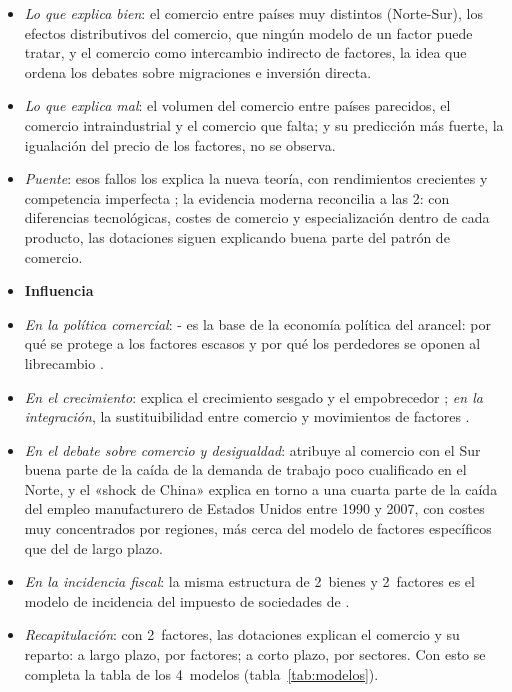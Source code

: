 \documentclass[11pt]{article}
\begin{document}
\begin{itemize}

\item \emph{Lo que explica bien}: el comercio entre países muy distintos (Norte-Sur), los efectos distributivos del comercio, que ningún modelo de un factor puede tratar, y el comercio como intercambio indirecto de factores, la idea que ordena los debates sobre migraciones e inversión directa.
\item \emph{Lo que explica mal}: el volumen del comercio entre países parecidos, el comercio intraindustrial y el comercio que falta\nocite{Trefler1995Case}; y su predicción más fuerte, la igualación del precio de los factores, no se observa.
\item \emph{Puente}: esos fallos los explica la nueva teoría, con rendimientos crecientes y competencia imperfecta ; la evidencia moderna reconcilia a las 2: con diferencias tecnológicas, costes de comercio y especialización dentro de cada producto, las dotaciones siguen explicando buena parte del patrón de comercio\nocite{Leamer1995Heckscher}.
\item[] \textbf{Influencia}

\item \emph{En la política comercial}: - es la base de la economía política del arancel: por qué se protege a los factores escasos y por qué los perdedores se oponen al librecambio  .
\item \emph{En el crecimiento}:  explica el crecimiento sesgado y el empobrecedor ; \emph{en la integración}, la sustituibilidad entre comercio y movimientos de factores\nocite{Mundell1957} .
\item \emph{En el debate sobre comercio y desigualdad}: \textcite{Wood1994North} atribuye al comercio con el Sur buena parte de la caída de la demanda de trabajo poco cualificado en el Norte, y el «shock de China» explica en torno a una cuarta parte de la caída del empleo manufacturero de Estados Unidos entre 1990 y 2007, con costes muy concentrados por regiones\nocite{AutorDornHanson2013China}, más cerca del modelo de factores específicos que del de largo plazo.
\item \emph{En la incidencia fiscal}: la misma estructura de 2~bienes y 2~factores es el modelo de incidencia del impuesto de sociedades de  .
\item \emph{Recapitulación}: con 2~factores, las dotaciones explican el comercio y su reparto: a largo plazo, por factores; a corto plazo, por sectores. Con esto se completa la tabla de los 4~modelos (tabla~\ref{tab:modelos}).
\end{itemize}
\end{document}
